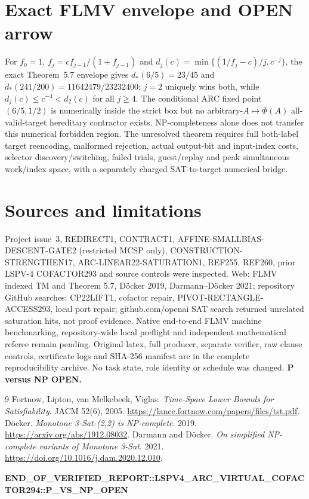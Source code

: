 \documentclass[10pt]{article}
\begin{document}
\section{Exact FLMV envelope and OPEN arrow}
For $f_0=1$, $f_j=cf_{j-1}/(1+f_{j-1})$ and $d_j(c)=\min\{(1/f_j-c)/j,c^{-j}\}$, the exact Theorem~5.7 envelope gives $d_*(6/5)=23/45$ and $d_*(241/200)=11642479/23232400$; $j=2$ uniquely wins both, while $d_j(c)\le c^{-4}<d_2(c)$ for all $j\ge4$. The conditional ARC fixed point $(6/5,1/2)$ is numerically inside the strict box but no arbitrary-$A\mapsto\Phi(A)$ all-valid-target hereditary contractor exists. NP-completeness alone does not transfer this numerical forbidden region. The unresolved theorem requires full both-label target reencoding, malformed rejection, actual output-bit and input-index costs, selector discovery/switching, failed trials, guest/replay and peak simultaneous work/index space, with a separately charged SAT-to-target numerical bridge.

\section{Sources and limitations}
Project issue~3, REDIRECT1, CONTRACT1, AFFINE-SMALLBIAS-DESCENT-GATE2 (restricted MCSP only), CONSTRUCTION-STRENGTHEN17, ARC-LINEAR22-SATURATION1, REF255, REF260, prior LSPV-4 COFACTOR293 and source controls were inspected. Web: FLMV indexed TM and Theorem 5.7, D\"ocker 2019, Darmann--D\"ocker 2021; repository GitHub searches: CP22LIFT1, cofactor repair, PIVOT-RECTANGLE-ACCESS293, local port repair; github.com/openai SAT search returned unrelated saturation hits, not proof evidence. Native end-to-end FLMV machine benchmarking, repository-wide local preflight and independent mathematical referee remain pending. Original latex, full producer, separate verifier, raw clause controls, certificate logs and SHA-256 manifest are in the complete reproducibility archive. No task state, role identity or schedule was changed. \textbf{P versus NP OPEN.}

\begin{thebibliography}{9}
 Fortnow, Lipton, van Melkebeek, Viglas. \emph{Time-Space Lower Bounds for Satisfiability}. JACM 52(6), 2005. \url{https://lance.fortnow.com/papers/files/tst.pdf}.
 D\"ocker. \emph{Monotone 3-Sat-(2,2) is NP-complete}. 2019. \url{https://arxiv.org/abs/1912.08032}.
 Darmann and D\"ocker. \emph{On simplified NP-complete variants of Monotone 3-Sat}. 2021. \url{https://doi.org/10.1016/j.dam.2020.12.010}.
\end{thebibliography}
\noindent\textbf{END\_OF\_VERIFIED\_REPORT::LSPV4\_ARC\_VIRTUAL\_COFACTOR294::P\_VS\_NP\_OPEN}
\end{document}
